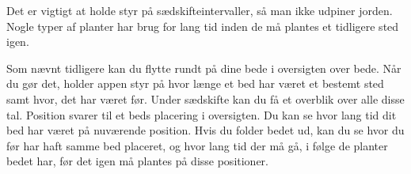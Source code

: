 \begin{minipage}{0.55\textwidth}
Det er vigtigt at holde styr på sædskifteintervaller, så man ikke udpiner jorden. Nogle typer af planter har brug for lang tid inden de må plantes et tidligere sted igen.

Som nævnt tidligere kan du flytte rundt på dine bede i oversigten over bede. Når du gør det, holder appen styr på hvor længe et bed har været et bestemt sted samt hvor, det har været før. Under sædskifte kan du få et overblik over alle disse tal. Position svarer til et beds placering i oversigten. Du kan se hvor lang tid dit bed har været på nuværende position. Hvis du folder bedet ud, kan du se hvor du før har haft samme bed placeret, og hvor lang tid der må gå, i følge de planter bedet har, før det igen må plantes på disse positioner.
\end{minipage} 


